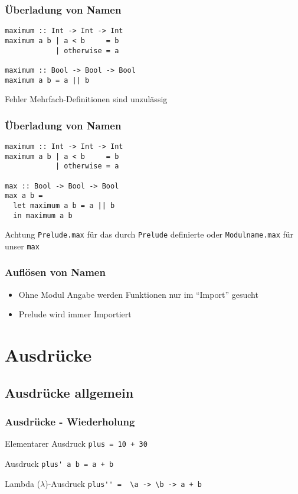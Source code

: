 \begin{frame}[fragile]
\frametitle{Überladung von Namen} 
\begin{lstlisting}
maximum :: Int -> Int -> Int
maximum a b | a < b 	= b
            | otherwise = a

maximum :: Bool -> Bool -> Bool
maximum a b = a || b
\end{lstlisting}
\begin{alertblock}{Fehler}
Mehrfach-Definitionen sind unzulässig
\end{alertblock}
\end{frame}

\begin{frame}[fragile]
\frametitle{Überladung von Namen} 
\begin{lstlisting}
maximum :: Int -> Int -> Int
maximum a b | a < b 	= b
            | otherwise = a

max :: Bool -> Bool -> Bool
max a b = 
  let maximum a b = a || b
  in maximum a b
\end{lstlisting}
\begin{alertblock}{Achtung}
\lstinline|Prelude.max| für das durch \lstinline|Prelude| definierte oder \lstinline|Modulname.max| für unser \lstinline|max|
\end{alertblock}
\end{frame}


\begin{frame}
\frametitle{Auflösen von Namen}
\begin{block}{\vspace*{-3ex}}
\begin{itemize}
  \item Ohne Modul Angabe werden Funktionen nur im "`Import"' gesucht
  \item Prelude wird immer Importiert 
\end{itemize}
\end{block}
\end{frame}



\section{Ausdrücke}
\subsection{Ausdrücke allgemein}
\begin{frame}
\frametitle{Ausdrücke - Wiederholung} 
\begin{exampleblock}{Elementarer Ausdruck}
\lstinline|plus = 10 + 30|
\end{exampleblock}
\begin{exampleblock}{Ausdruck}
\lstinline|plus' a b = a + b|
\end{exampleblock}
\begin{exampleblock}{Lambda ($\lambda$)-Ausdruck}
\lstinline|plus'' =  \a -> \b -> a + b|
\end{exampleblock}
\end{frame}

